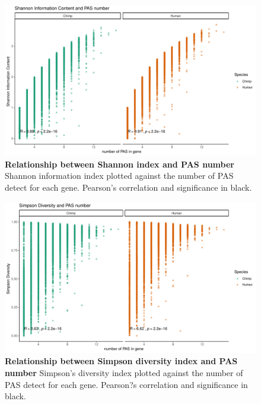 \begin{figure}[!htb]
\centering
\includegraphics[width=5in]{img/ch03/Fig2-figSup5.pdf}
\caption[Relationship between Shannon index and PAS number ]{\textbf{Relationship between Shannon index and PAS number} Shannon information index plotted against the number of PAS detect for each gene. Pearson's correlation and significance in black. }
\label{fig:ch03-shanonNum}
\end{figure}
\clearpage

\begin{figure}[!htb]
\centering
\includegraphics[width=5in]{img/ch03/Fig2-figSup6.pdf}
\caption[Relationship between Simpson diversity index and PAS number]{\textbf{Relationship between Simpson diversity index and PAS number} Simpson's diversity index plotted against the number of PAS detect for each gene. Pearson?s correlation and significance in black.}
\label{fig:ch03-simpNum}
\end{figure}
\clearpage

